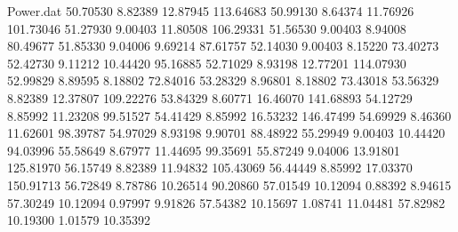 \begin{filecontents}{Power.dat}
  50.70530    8.82389   12.87945  113.64683
  50.99130    8.64374   11.76926  101.73046
  51.27930    9.00403   11.80508  106.29331
  51.56530    9.00403    8.94008   80.49677
  51.85330    9.04006    9.69214   87.61757
  52.14030    9.00403    8.15220   73.40273
  52.42730    9.11212   10.44420   95.16885
  52.71029    8.93198   12.77201  114.07930
  52.99829    8.89595    8.18802   72.84016
  53.28329    8.96801    8.18802   73.43018
  53.56329    8.82389   12.37807  109.22276
  53.84329    8.60771   16.46070  141.68893
  54.12729    8.85992   11.23208   99.51527
  54.41429    8.85992   16.53232  146.47499
  54.69929    8.46360   11.62601   98.39787
  54.97029    8.93198    9.90701   88.48922
  55.29949    9.00403   10.44420   94.03996
  55.58649    8.67977   11.44695   99.35691
  55.87249    9.04006   13.91801  125.81970
  56.15749    8.82389   11.94832  105.43069
  56.44449    8.85992   17.03370  150.91713
  56.72849    8.78786   10.26514   90.20860
  57.01549   10.12094    0.88392    8.94615
  57.30249   10.12094    0.97997    9.91826
  57.54382   10.15697    1.08741   11.04481
  57.82982   10.19300    1.01579   10.35392
\end{filecontents}
